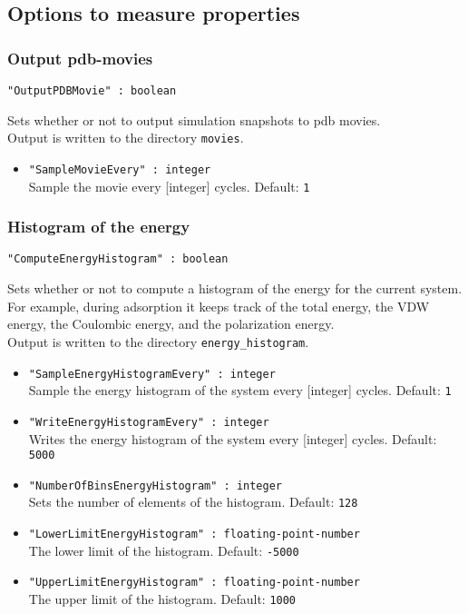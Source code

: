 \subsection{Options to measure properties}

\subsubsection{Output pdb-movies}
\begin{framed}
\verb+"OutputPDBMovie" : boolean+
\end{framed}
Sets whether or not to output simulation snapshots to pdb movies.\\
Output is written to the directory \verb+movies+.
\begin{itemize}
\item{\verb+"SampleMovieEvery" : integer+}\\
Sample the movie every [integer] cycles. Default: \verb+1+
\end{itemize}

\subsubsection{Histogram of the energy}
\begin{framed}
\verb+"ComputeEnergyHistogram" : boolean+
\end{framed}
Sets whether or not to compute a histogram of the energy for the current system.
For example, during adsorption it keeps track of the total energy, the VDW energy,
the Coulombic energy, and the polarization energy.\\
Output is written to  the directory \verb+energy_histogram+.
\begin{itemize}
\item{\verb+"SampleEnergyHistogramEvery" : integer+}\\
Sample the energy histogram of the system every [integer] cycles. Default: \verb+1+
\item{\verb+"WriteEnergyHistogramEvery" : integer+}\\
Writes the energy histogram of the system every [integer] cycles. Default: \verb+5000+
\item{\verb+"NumberOfBinsEnergyHistogram" : integer+}\\
Sets the number of elements of the histogram. Default: \verb+128+
\item{\verb+"LowerLimitEnergyHistogram" : floating-point-number+}\\
The lower limit of the histogram. Default: \verb+-5000+
\item{\verb+"UpperLimitEnergyHistogram" : floating-point-number+}\\
The upper limit of the histogram. Default: \verb+1000+
\end{itemize}

